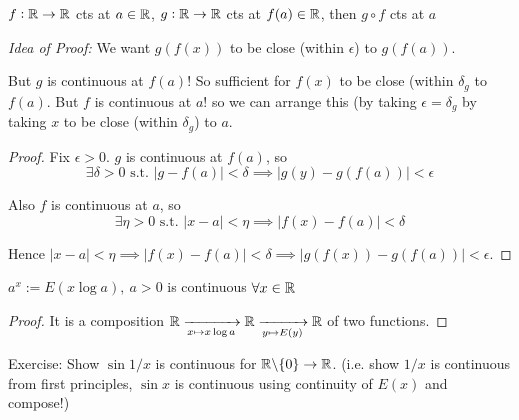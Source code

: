 \documentclass[twoside]{scrartcl}
\begin{document}
\begin{theorem}
	$f:\mathbb{R} \to \mathbb{R}$ cts at $a \in \mathbb{R}$, $g:\mathbb{R} \to \mathbb{R}$ cts at $f(a) \in \mathbb{R}$, then $g \circ f$ cts at $a$
\end{theorem}

\emph{Idea of Proof:} We want $g(f(x))$ to be close (within $\epsilon$) to $g(f(a))$. 

But $g$ is continuous at $f(a)$! So sufficient for $f(x)$ to be close (within $\delta_g$ to $f(a)$. But $f$ is continuous at $a$! so we can arrange this (by taking $\epsilon = \delta_g$ by taking $x$ to be close (within $\delta_g$) to $a$. 

\begin{proof}
Fix $\epsilon >0.$ $g$ is continuous at $f(a)$, so \[\exists \delta > 0\text{ s.t. }|g - f(a)| < \delta \implies |g(y) - g(f(a))| < \epsilon\]

Also $f$ is continuous at $a$, so 
\[\exists \eta > 0\text{ s.t. }|x-a| < \eta \implies |f(x) - f(a)| < \delta\]

\noindent Hence $|x-a| < \eta \implies |f(x) - f(a)| < \delta \implies |g(f(x)) - g(f(a))| < \epsilon.$
\end{proof}

\begin{corollary}
$a^x:= E(x\log a), ~a>0$ is continuous $\forall x \in\mathbb{R}$	
\end{corollary}
\begin{proof}
It is a composition $\displaystyle{\mathbb{R}\xrightarrow[x \mapsto x\log a]{} \mathbb{R}\xrightarrow[y \mapsto E(y)]{} \mathbb{R}}$ of two functions.	
\end{proof}

Exercise: Show $\sin 1/x$ is continuous for $\mathbb{R}\backslash\{0\} \to \mathbb{R}$. (i.e. show $1/x$ is continuous from first principles, $\sin x$ is continuous using continuity of $E(x)$ and compose!)\vspace*{15pt}
\end{document}

